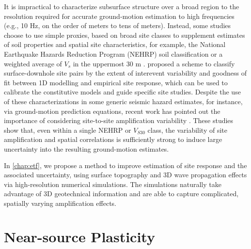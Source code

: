 It is impractical to characterize subsurface structure over a broad region to the resolution required for accurate ground-motion estimation to high frequencies (e.g., 10 Hz, on the order of meters to tens of meters). Instead, some studies choose to use simple proxies, based on broad site classes to supplement estimates of soil properties and spatial site characteristics, for example, the National Earthquake Hazards Reduction Program (NEHRP) soil classification \citep{bssc2003NEHRPRecommended2003,akkarEmpiricalEquationsPrediction2010} or a weighted average of $V_s$ in the uppermost 30 m \citep[$V_{S30}$, e.g., ][]{abrahamsonSummaryAbrahamsonSilva2008,idrissNGAWest2EmpiricalModel2014}. \citet{thompsonTaxonomySiteResponse2012} proposed a scheme to classify surface-downhole site pairs by the extent of interevent variability and goodness of fit between 1D modelling and empirical site response, which can be used to calibrate the constitutive models and guide specific site studies. Despite the use of these characterizations in some generic seismic hazard estimates, for instance, via ground-motion prediction equations, recent work has pointed out the importance of considering site-to-site amplification variability \citep{atkinsonEarthquakeGroundmotionPrediction2006,atikVariabilityGroundmotionPrediction2010}. These studies show that, even within a single NEHRP or $V_{S30}$ class, the variability of site amplification and spatial correlations is sufficiently strong to induce large uncertainty into the resulting ground-motion estimates.

In \cref{chap:etf}, we propose a method to improve estimation of site response and the associated uncertainty, using surface topography and 3D wave propagation effects via high-resolution numerical simulations. The simulations naturally take advantage of 3D geotechnical information and are able to capture complicated, spatially varying amplification effects.

\section{Near-source Plasticity}

